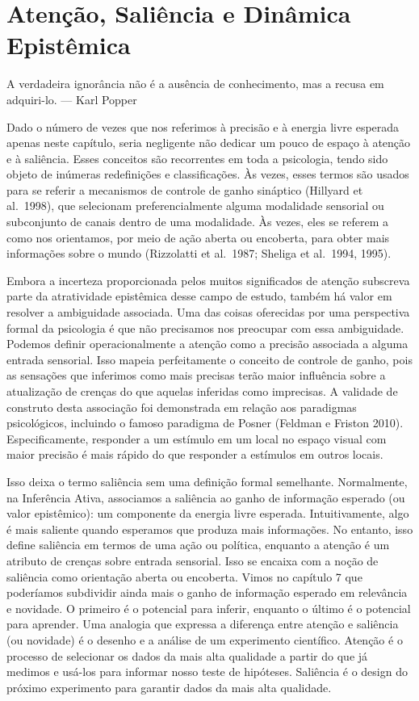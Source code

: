 \documentclass[
  12pt,
]{book}
\begin{document}
\hypertarget{atenuxe7uxe3o-saliuxeancia-e-dinuxe2mica-epistuxeamica}{%
\section{Atenção, Saliência e Dinâmica Epistêmica}\label{atenuxe7uxe3o-saliuxeancia-e-dinuxe2mica-epistuxeamica}}

A verdadeira ignorância não é a ausência de conhecimento, mas a recusa em adquiri-lo. --- Karl Popper

Dado o número de vezes que nos referimos à precisão e à energia livre esperada apenas neste capítulo, seria negligente não dedicar um pouco de espaço à atenção e à saliência. Esses conceitos são recorrentes em toda a psicologia, tendo sido objeto de inúmeras redefinições e classificações. Às vezes, esses termos são usados para se referir a mecanismos de controle de ganho sináptico (Hillyard et al.~1998), que selecionam preferencialmente alguma modalidade sensorial ou subconjunto de canais dentro de uma modalidade. Às vezes, eles se referem a como nos orientamos, por meio de ação aberta ou encoberta, para obter mais informações sobre o mundo (Rizzolatti et al.~1987; Sheliga et al.~1994, 1995).

Embora a incerteza proporcionada pelos muitos significados de atenção subscreva parte da atratividade epistêmica desse campo de estudo, também há valor em resolver a ambiguidade associada. Uma das coisas oferecidas por uma perspectiva formal da psicologia é que não precisamos nos preocupar com essa ambiguidade. Podemos definir operacionalmente a atenção como a precisão associada a alguma entrada sensorial. Isso mapeia perfeitamente o conceito de controle de ganho, pois as sensações que inferimos como mais precisas terão maior influência sobre a atualização de crenças do que aquelas inferidas como imprecisas. A validade de construto desta associação foi demonstrada em relação aos paradigmas psicológicos, incluindo o famoso paradigma de Posner (Feldman e Friston 2010). Especificamente, responder a um estímulo em um local no espaço visual com maior precisão é mais rápido do que responder a estímulos em outros locais.

Isso deixa o termo saliência sem uma definição formal semelhante. Normalmente, na Inferência Ativa, associamos a saliência ao ganho de informação esperado (ou valor epistêmico): um componente da energia livre esperada. Intuitivamente, algo é mais saliente quando esperamos que produza mais informações. No entanto, isso define saliência em termos de uma ação ou política, enquanto a atenção é um atributo de crenças sobre entrada sensorial. Isso se encaixa com a noção de saliência como orientação aberta ou encoberta. Vimos no capítulo 7 que poderíamos subdividir ainda mais o ganho de informação esperado em relevância e novidade. O primeiro é o potencial para inferir, enquanto o último é o potencial para aprender. Uma analogia que expressa a diferença entre atenção e saliência (ou novidade) é o desenho e a análise de um experimento científico. Atenção é o processo de selecionar os dados da mais alta qualidade a partir do que já medimos e usá-los para informar nosso teste de hipóteses. Saliência é o design do próximo experimento para garantir dados da mais alta qualidade.
\end{document}
